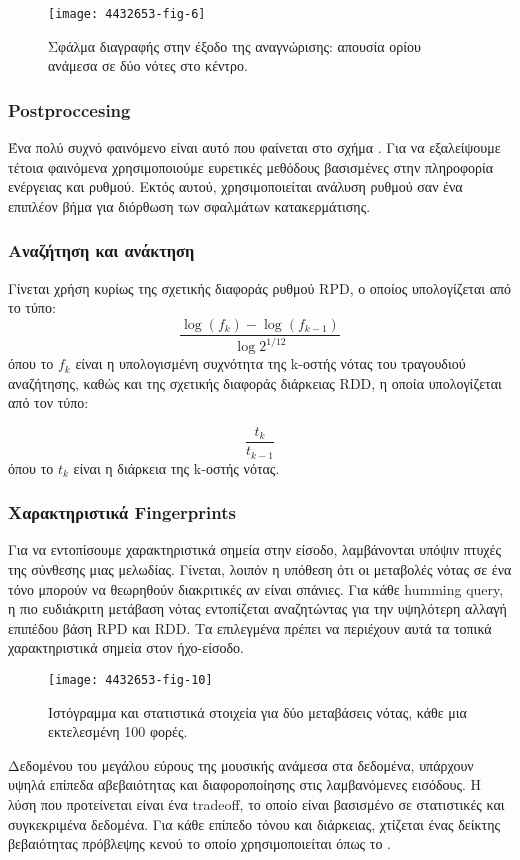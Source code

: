 \begin{figure}
	\centering
	\texttt{[image: 4432653-fig-6]}
	\caption{Σφάλμα διαγραφής στην έξοδο της αναγνώρισης: απουσία ορίου ανάμεσα σε δύο νότες στο κέντρο.}
	\label{fig:4432653-fig-6}
\end{figure}

\subsubsection{Postproccesing}
Ένα πολύ συχνό φαινόμενο είναι αυτό που φαίνεται στο σχήμα .
Για να εξαλείψουμε τέτοια φαινόμενα χρησιμοποιούμε ευρετικές μεθόδους βασισμένες στην
πληροφορία ενέργειας και ρυθμού. Εκτός αυτού, χρησιμοποιείται ανάλυση ρυθμού
σαν ένα επιπλέον βήμα για διόρθωση των σφαλμάτων κατακερμάτισης.

\subsubsection{Αναζήτηση και ανάκτηση}
Γίνεται χρήση κυρίως της σχετικής διαφοράς ρυθμού RPD, ο οποίος υπολογίζεται
από το τύπο:
\begin{equation*}
	\dfrac{\log(f_k)-\log(f_{k-1})}{\log2^{1/12}}
\end{equation*}
όπου το $f_{k}$ είναι η υπολογισμένη συχνότητα της k-οστής νότας του τραγουδιού
αναζήτησης, καθώς και της σχετικής διαφοράς διάρκειας RDD, η οποία υπολογίζεται
από τον τύπο:

\begin{equation*}
	\dfrac{t_k}{t_{k-1}}
\end{equation*}
όπου το $t_{k}$ είναι η διάρκεια της k-οστής νότας.

\subsubsection{Χαρακτηριστικά Fingerprints}
Για να εντοπίσουμε χαρακτηριστικά σημεία στην είσοδο, λαμβάνονται υπόψιν πτυχές
της σύνθεσης μιας μελωδίας. Γίνεται, λοιπόν η υπόθεση ότι οι μεταβολές νότας σε
ένα τόνο μπορούν να θεωρηθούν διακριτικές αν είναι σπάνιες. Για κάθε humming
query, η πιο ευδιάκριτη μετάβαση νότας εντοπίζεται αναζητώντας για την υψηλότερη
αλλαγή επιπέδου βάση RPD και RDD. Τα επιλεγμένα \fps{} πρέπει να περιέχουν αυτά
τα τοπικά χαρακτηριστικά σημεία στον ήχο-είσοδο.

\begin{wrapfigure}[13]{R}{0.5\textwidth}
	\centering
	\vspace{-20pt}\texttt{[image: 4432653-fig-10]}
	\vspace{-20pt}\caption{Ιστόγραμμα και στατιστικά στοιχεία για δύο μεταβάσεις νότας, κάθε μια εκτελεσμένη 100 φορές.}
	\label{fig:4432653-fig-10}
\end{wrapfigure}

Δεδομένου του μεγάλου εύρους της μουσικής ανάμεσα στα δεδομένα, υπάρχουν υψηλά
επίπεδα αβεβαιότητας και διαφοροποίησης στις λαμβανόμενες εισόδους. Η λύση που
προτείνεται είναι ένα tradeoff, το οποίο είναι βασισμένο σε στατιστικές και
συγκεκριμένα δεδομένα. Για κάθε επίπεδο τόνου και διάρκειας, χτίζεται ένας
δείκτης βεβαιότητας πρόβλεψης κενού το οποίο χρησιμοποιείται όπως το .
\undef{\fp}
\undef{\fps}
